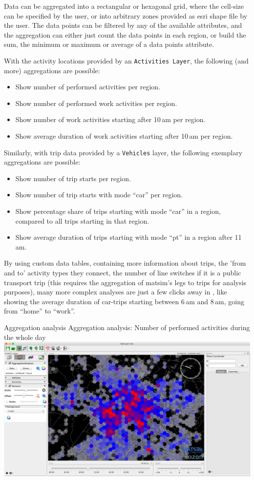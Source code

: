 Data can be aggregated into a rectangular or hexagonal grid, where the cell-size
can be specified by the user, or into arbitrary zones provided as \gls{esri} shape file by the user. The data points can be filtered by any of the
available attributes, and the aggregation can either just count the data points
in each region, or build the sum, the minimum or maximum or average of a data points
attribute.

With the activity locations provided by an
\lstinline|Activities Layer|, the following (and more) aggregations are possible:
\begin{itemize}\styleItemize
  \item Show number of performed activities per region.
  \item Show number of performed work activities per region.
  \item Show number of work activities starting after 10\,am per region.
  \item Show average duration of work activities starting after 10\,am per
  region.
\end{itemize}
Similarly, with  trip data provided by a \lstinline|Vehicles| layer, the following
exemplary aggregations are possible:
\begin{itemize}\styleItemize
  \item Show number of trip starts per region.
  \item Show number of trip starts with mode ``car'' per region.
  \item Show percentage share of trips starting with mode ``car'' in a
  region, compared to all trips starting in that region.
  \item Show average duration of trips starting with mode ``pt'' in a region
  after 11\,am.
\end{itemize}

By using custom data tables, \eg containing more information about trips, \ie
the 'from and to' activity types they connect, the number of line switches if
it is a public transport trip (this requires the aggregation of \gls{matsim}'s legs
to trips for analysis purposes), many more complex analyses are just a few
clicks away in \Via{}, like showing the average duration of car-trips starting
between 6\,am and 8\,am, going from ``home'' to ``work''.

\createfigure%
{Aggregation analysis}%
{Aggregation analysis: Number of performed activities during the whole day}%
{\label{fig:via:aggregation}}%
{\includegraphics[width=1.\textwidth,angle=0]{./extending/figures/via/aggregation}}%
{}


